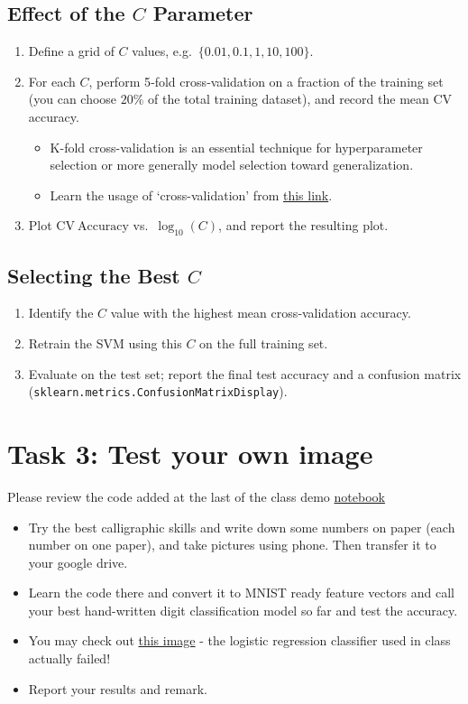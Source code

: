 \documentclass[12pt]{article}
\begin{document}
\subsection*{Effect of the \(C\) Parameter}
\begin{enumerate}
  \item Define a grid of \(C\) values, e.g.\ \(\{0.01, 0.1, 1, 10, 100\}\).
  \item For each \(C\), perform 5‐fold cross‐validation on a fraction of the training set (you can choose $20\%$ of the total training dataset), and record the mean CV accuracy. 
  \begin{itemize}
      \item K-fold cross-validation is an essential technique for hyperparameter selection or more generally model selection toward generalization. 
      \item Learn the usage of `cross-validation' from \href{https://scikit-learn.org/stable/modules/cross_validation.html#multimetric-cross-validation}{this link}.
  \end{itemize}
  \item Plot \(\mathrm{CV\ Accuracy}\) vs.\ \(\log_{10}(C)\), and report the resulting plot. 
\end{enumerate}

\subsection*{Selecting the Best \(C\)}
\begin{enumerate}
  \item Identify the \(C\) value with the highest mean cross‐validation accuracy.
  \item Retrain the SVM using this \(C\) on the full training set.
  \item Evaluate on the test set; report the final test accuracy and a confusion matrix (\texttt{sklearn.metrics.ConfusionMatrixDisplay}).
\end{enumerate}

\section*{Task 3: Test your own image}
Please review the code added at the last of the class demo \href{https://umsystem.instructure.com/courses/280496/files/33967083?module_item_id=9952773}{notebook}

\begin{itemize}
    \item Try the best calligraphic skills and write down some numbers on paper (each number on one paper), and take pictures using phone. Then transfer it to your google drive. 
    \item Learn the code there and convert it to MNIST ready feature vectors and call your best hand-written digit classification model so far and test the accuracy.
    \item You may check out \href{https://umsystem.instructure.com/courses/280496/files/33966714?module_item_id=9952778}{this image} - the logistic regression classifier used in class actually failed!
    \item Report your results and remark. 
\end{itemize}
\end{document}

